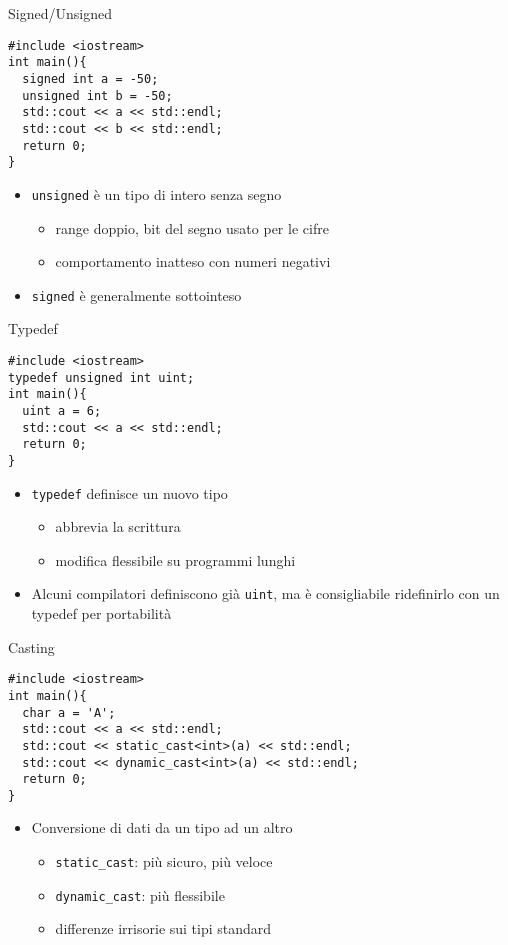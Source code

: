 \begin{frame}[fragile]{Signed/Unsigned}
  \vfill
  \begin{lstlisting}
#include <iostream>
int main(){
  signed int a = -50;
  unsigned int b = -50;
  std::cout << a << std::endl;
  std::cout << b << std::endl;
  return 0;
}
  \end{lstlisting}
  \vfill
  \begin{itemize}
    \item \lstinline$unsigned$ è un tipo di intero senza segno
    \begin{itemize}
      \item range doppio, bit del segno usato per le cifre
      \item comportamento inatteso con numeri negativi
    \end{itemize}
    \vfill
    \item \lstinline$signed$ è generalmente sottointeso
  \end{itemize}
  \vfill
\end{frame}

\begin{frame}[fragile]{Typedef}
  \vfill
  \begin{lstlisting}
#include <iostream>
typedef unsigned int uint;
int main(){
  uint a = 6;
  std::cout << a << std::endl;
  return 0;
}
  \end{lstlisting}
  \vfill
  \begin{itemize}
    \item \lstinline$typedef$ definisce un nuovo tipo
    \begin{itemize}
      \item abbrevia la scrittura
      \item modifica flessibile su programmi lunghi
    \end{itemize}
    \vfill
    \item Alcuni compilatori definiscono già \lstinline$uint$, ma è consigliabile
    ridefinirlo con un typedef per portabilità
  \end{itemize}
  \vfill
\end{frame}

\begin{frame}[fragile]{Casting}
  \vfill
  \begin{lstlisting}
#include <iostream>
int main(){
  char a = 'A';
  std::cout << a << std::endl;
  std::cout << static_cast<int>(a) << std::endl;
  std::cout << dynamic_cast<int>(a) << std::endl;
  return 0;
}
  \end{lstlisting}
  \vfill
  \begin{itemize}
    \item Conversione di dati da un tipo ad un altro
    \begin{itemize}
      \item \lstinline$static_cast$: più sicuro, più veloce
      \item \lstinline$dynamic_cast$: più flessibile
      \item differenze irrisorie sui tipi standard
    \end{itemize}
  \end{itemize}
  \vfill
\end{frame}

